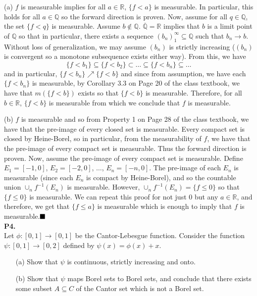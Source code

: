 \documentclass{article}
\begin{document}
    (a) $f$ is measurable implies for all $a\in\mathbb{R}$, $\{f < a\}$ is measurable. In particular, this holds for all
    $a\in\mathbb{Q}$ so the forward direction is proven. Now, assume for all $q\in\mathbb{Q}$, the set $\{f < q\}$ is measurable.
    Assume $b\not\in\mathbb{Q}$. $\overline{\mathbb{Q}}=\mathbb{R}$ implies that $b$ is a limit point of $\mathbb{Q}$ so that
    in particular, there exists a sequence $(b_n)_1^{\infty}\subseteq\mathbb{Q}$ such that $b_n\to b$. Without loss of
    generalization, we may assume $(b_n)$ is strictly increasing ($(b_n)$ is convergent so a monotone subsequence exists
    either way). From this, we have 
    \[ \{f < b_1\} \subseteq \{f < b_2\} \subset \hdots \subseteq \{f < b_n\} \subseteq \hdots \]
    and in particular, $\{f < b_n\} \nearrow \{f < b\}$ and since from assumption, we have each $\{f < b_n\}$ is measurable, by
    Corollary 3.3 on Page 20 of the class textbook, we have that $m(\{f < b\})$ exists so that $\{f < b\}$ is measurable.
    Therefore, for all $b\in\mathbb{R}$, $\{f < b\}$ is measurable from which we conclude that $f$ is measurable.\\

    \newpage

    (b) $f$ is measurable and so from Property 1 on Page 28 of the class textbook, we have that the pre-image of every
    closed set is measurable. Every compact set is closed by Heine-Borel, so in particular, from the measurability of $f$,
    we have that the pre-image of every compact set is measurable. Thus the forward direction is proven. Now, assume
    the pre-image of every compact set is measurable. Define $E_1 = [-1,0]$, $E_2 = [-2,0]$, $\hdots$, $E_n = [-n, 0]$.
    The pre-image of each $E_n$ is measurable (since each $E_n$ is compact by Heine-Borel),
    and so the countable union $\cup_n f^{-1}(E_n)$ is measurable.
    However, $\cup_n f^{-1}(E_n) = \{f\leq 0\}$ so that $\{f\leq 0\}$ is measurable. We can repeat this proof for not just
    0 but any $a\in\mathbb{R}$, and therefore, we get that $\{f\leq a\}$ is measurable which is enough to imply that $f$
    is measurable.$\hfill\blacksquare$\\

    \textbf{P4.}\\

    Let $\phi:[0,1]\to[0,1]$ be the Cantor-Lebesgue function. Consider the function $\psi:[0,1]\to[0,2]$ defined by
    $\psi(x) = \phi(x) + x$.

    \begin{enumerate}
        \item[(a)] Show that $\psi$ is continuous, strictly increasing and onto.
        \item[(b)] Show that $\psi$ maps Borel sets to Borel sets, and conclude that there exists some subset $A\subseteq C$ of
            the Cantor set which is not a Borel set.
    \end{enumerate}
\end{document}
